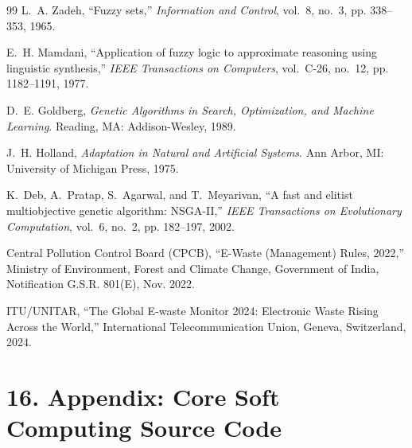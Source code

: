 \documentclass[12pt,a4paper]{article}
\begin{document}
\begin{thebibliography}{99}
L.~A. Zadeh, ``Fuzzy sets,'' \emph{Information and Control}, vol.~8, no.~3, pp. 338--353, 1965.

E.~H. Mamdani, ``Application of fuzzy logic to approximate reasoning using linguistic synthesis,'' \emph{IEEE Transactions on Computers}, vol.~C-26, no.~12, pp. 1182--1191, 1977.

D.~E. Goldberg, \emph{Genetic Algorithms in Search, Optimization, and Machine Learning}. Reading, MA: Addison-Wesley, 1989.

J.~H. Holland, \emph{Adaptation in Natural and Artificial Systems}. Ann Arbor, MI: University of Michigan Press, 1975.

K.~Deb, A.~Pratap, S.~Agarwal, and T.~Meyarivan, ``A fast and elitist multiobjective genetic algorithm: NSGA-II,'' \emph{IEEE Transactions on Evolutionary Computation}, vol.~6, no.~2, pp. 182--197, 2002.

Central Pollution Control Board (CPCB), ``E-Waste (Management) Rules, 2022,'' Ministry of Environment, Forest and Climate Change, Government of India, Notification G.S.R. 801(E), Nov. 2022.

ITU/UNITAR, ``The Global E-waste Monitor 2024: Electronic Waste Rising Across the World,'' International Telecommunication Union, Geneva, Switzerland, 2024.
\end{thebibliography}

\section*{16. Appendix: Core Soft Computing Source Code}
\end{document}
